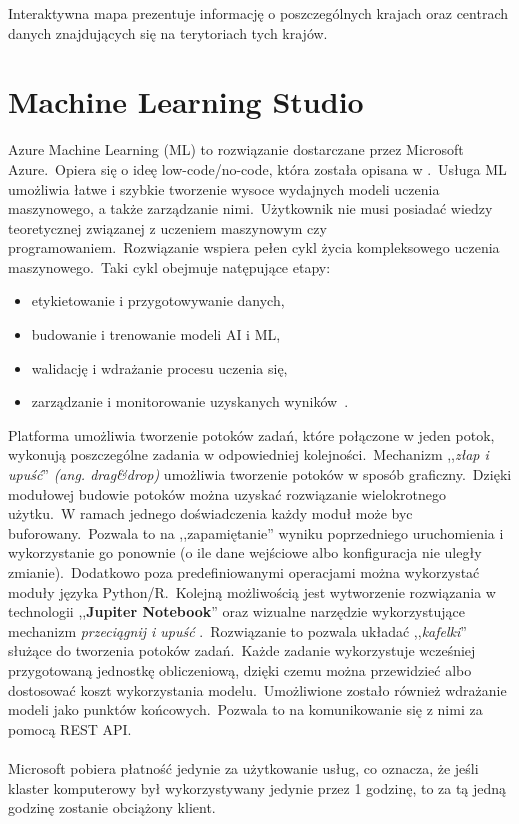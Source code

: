 Interaktywna mapa prezentuje informację o poszczególnych krajach oraz centrach danych znajdujących się na terytoriach tych krajów.

\section{Machine Learning Studio}
Azure Machine Learning (ML) to rozwiązanie dostarczane przez Microsoft Azure.\ Opiera się o ideę low-code/no-code, która została opisana w .\ Usługa ML umożliwia łatwe i szybkie tworzenie wysoce wydajnych modeli uczenia maszynowego, a także zarządzanie nimi.\ Użytkownik nie musi posiadać wiedzy teoretycznej związanej z uczeniem maszynowym czy programowaniem.\ Rozwiązanie wspiera pełen cykl życia kompleksowego uczenia maszynowego.\ Taki cykl obejmuje natępujące etapy:
\begin{itemize}
    \item etykietowanie i przygotowywanie danych,
    \item budowanie i trenowanie modeli AI i ML,
    \item walidację i wdrażanie procesu uczenia się,
    \item zarządzanie i monitorowanie uzyskanych wyników~\cite{MicrosoftAzure}.
\end{itemize}


Platforma umożliwia tworzenie potoków zadań, które połączone w jeden potok, wykonują poszczególne zadania w odpowiedniej kolejności.\ Mechanizm ,,\textit{złap i upuść}'' \textit{(ang. drag\&drop)} umożliwia tworzenie potoków w sposób graficzny.\ Dzięki modułowej budowie potoków można uzyskać rozwiązanie wielokrotnego użytku.\ W ramach jednego doświadczenia każdy moduł może byc buforowany.\ Pozwala to na ,,zapamiętanie'' wyniku poprzedniego uruchomienia i wykorzystanie go ponownie (o ile dane wejściowe albo konfiguracja nie uległy zmianie).\ Dodatkowo poza predefiniowanymi operacjami można wykorzystać moduły języka Python/R.\ Kolejną możliwością jest wytworzenie rozwiązania w technologii ,,\textbf{Jupiter Notebook}'' oraz wizualne narzędzie wykorzystujące mechanizm \textit{przeciągnij i upuść} .\ Rozwiązanie to pozwala układać ,,\textit{kafelki}'' służące do tworzenia potoków zadań.\ Każde zadanie wykorzystuje wcześniej przygotowaną jednostkę obliczeniową, dzięki czemu można przewidzieć albo dostosować koszt wykorzystania modelu.\ Umożliwione zostało również wdrażanie modeli jako punktów końcowych.\ Pozwala to na komunikowanie się z nimi za pomocą REST API.
\\ \\
Microsoft pobiera płatność jedynie za użytkowanie usług, co oznacza, że jeśli klaster komputerowy był wykorzystywany jedynie przez 1 godzinę, to za tą jedną godzinę zostanie obciążony klient\cite{MicrosoftAzuref}.